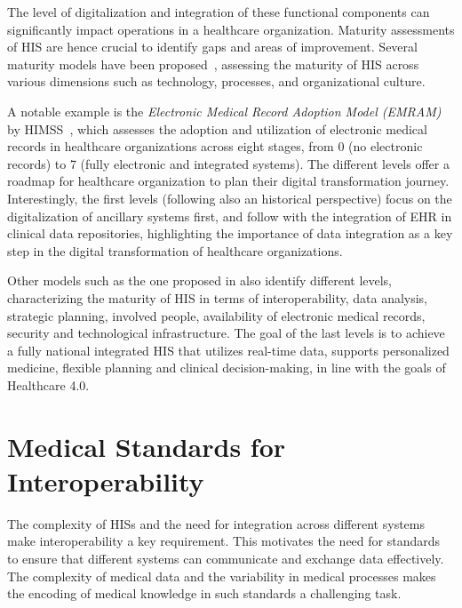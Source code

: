 The level of digitalization and integration of these functional components can significantly impact operations in a healthcare organization. 
%
Maturity assessments of \ac{HIS} are hence crucial to identify gaps and areas of improvement.
%
Several maturity models have been proposed~\cite{Gomes_Romão_2018}, assessing the maturity of \ac{HIS} across various dimensions such as technology, processes, and organizational culture.

A notable example is the \emph{Electronic Medical Record Adoption Model (EMRAM)} by HIMSS~\cite{HIMSS_EMRAM_Criteria}, which assesses the adoption and utilization of electronic medical records in healthcare organizations across eight stages, from 0 (no electronic records) to 7 (fully electronic and integrated systems).
%
The different levels offer a roadmap for healthcare organization to plan their digital transformation journey. 
%
Interestingly, the first levels (following also an historical perspective) focus on the digitalization of ancillary systems first, and follow with the integration of \ac{EHR} in clinical data repositories, highlighting the importance of data integration as a key step in the digital transformation of healthcare organizations.

Other models such as the one proposed in \cite{Carvalho_Rocha_van_de_Wetering_Abreu_2019} also identify different levels, characterizing the maturity of \ac{HIS} in terms of interoperability, data analysis, strategic planning, involved people, availability of electronic medical records, security and technological infrastructure. 
%
The goal of the last levels is to achieve a fully national integrated \ac{HIS} that utilizes real-time data, supports personalized medicine, flexible planning and clinical decision-making, in line with the goals of Healthcare 4.0.

\section{Medical Standards for Interoperability}

The complexity of \acp{HIS} and the need for integration across different systems make interoperability a key requirement. 
%
This motivates the need for standards to ensure that different systems can communicate and exchange data effectively. 
%
The complexity of medical data and the variability in medical processes makes the encoding of medical knowledge in such standards a challenging task. 

